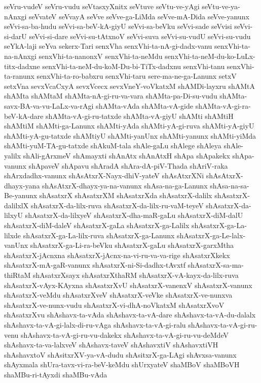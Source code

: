 {seVru-vudeV
seVru-vudu
seVtasxyXnitx
seVtuve
seVtu-ve-yAgi
seVtu-ve-ya-nAnxgi
seVvateV
seVvayA
seVve
seVve-ga-LiMda
seVve-mA-Dida
seVve-yanunx
seVvi-sa-ba-hudu
seVvi-sa-beV-kA-giyU
seVvi-sa-beVku
seVvi-sade
seVvisi
seVvi-si-darU
seVvi-si-dare
seVvi-su-tAtxnoV
seVvi-suva
seVvi-su-vudU
seVvi-su-vudu
seYkA-laji
seYva
sekerx-Tari
senxVha
senxVhi-ta-nA-gi-dadx-vanu
senxVhi-ta-na-nAnxgi
senxVhi-ta-nanonxV
senxVhi-ta-neMdu
senxVhi-ta-neM-du-ko-LuLx-titx-dadxne
senxVhi-ta-neM-du-koM-Du-bi-TiTx-dadxnu
senxVhi-tanu
senxVhi-ta-ranunx
senxVhi-ta-ro-babxru
senxVhi-taru
sere-ma-ne-ga-Lanunx
setxV
setxVna
sevxVcaCxyA
sevxVcecx
sevxVneY-voVkatxM
shAMDi-layxru
shAMtA
shAMta
shAMtaM
shAMta-nA-gi-ru-va-vara
shAMta-pa-Di-su-vudu
shAMta-savx-BA-va-vu-LaLx-va-rAgi
shAMta-vAda
shAMta-vA-gide
shAMta-vA-gi-ra-beV-kA-dare
shAMta-vA-gi-ru-tatxde
shAMta-vA-giyU
shAMti
shAMtiH
shAMtiM
shAMti-ga-Lanunx
shAMti-yAda
shAMti-yA-gi-ruva
shAMti-yA-giyU
shAMti-yA-gu-tatxde
shAMtiyU
shAMti-yanUnx
shAMti-yanunx
shAMti-yiMda
shAMti-yuM-TA-gu-tatxde
shAkuM-tala
shAle-gaLu
shAlege
shAleya
shAle-yalilx
shAli-gArxmeV
shAmayxti
shAnAtx
shAnAtxH
shApa
shApakekx
shApa-vanunx
shApaveV
shApavu
shAradA
shAra-dA-piV-Thada
shAriV-raka
shArxdadhx-vanunx
shAsAtxrX-Nayx-dhiV-yateV
shAsAtxrXNi
shAsAtxrX-dhayx-yana
shAsAtxrX-dhayx-ya-na-vanunx
shAsa-na-ga-Lanunx
shAsa-na-sa-Be-yanunx
shAsatxrX
shAsatxrXM
shAsatxrXda
shAsatxrX-dalilx
shAsatxrX-dalilxlX
shAsatxrX-da-lilx-ruva
shAsatxrX-da-lilx-ru-vaM-teyeV
shAsatxrX-da-lilxyU
shAsatxrX-da-lilxyeV
shAsatxrX-dha-maR-gaLu
shAsatxrX-diM-dalU
shAsatxrX-diM-daleV
shAsatxrX-gaLa
shAsatxrX-ga-Lalilx
shAsatxrX-ga-La-lilxde
shAsatxrX-ga-La-lilx-ruva
shAsatxrX-ga-Lanunx
shAsatxrX-ga-Le-lalx-vanUnx
shAsatxrX-ga-Li-ra-beVku
shAsatxrX-gaLu
shAsatxrX-garxMtha
shAsatxrX-jAcnxna
shAsatxrX-jAcnx-na-vi-ru-va-va-rige
shAsatxrXkekx
shAsatxrX-mA-gaR-vanunx
shAsatxrX-ni-Si-dadhx-tAvxtf
shAsatxrX-sa-ma-thiRtaM
shAsatxrXsayx
shAsatxrXthaRM
shAsatxrX-vA-kayx-da-lilx-ruva
shAsatxrX-vAyx-KAyxna
shAsatxrXvU
shAsatxrX-vanenxV
shAsatxrX-vanunx
shAsatxrX-veMdu
shAsatxrXveV
shAsatxrX-veVke
shAsatxrX-ve-nunxva
shAsatxrX-ve-nunx-vudu
shAsatxrX-vi-dhA-noVkatxM
shAsatxrXvoV
shAsatxrXvu
shAshavx-ta-vAda
shAshavx-ta-vA-dare
shAshavx-ta-vA-du-dalalx
shAshavx-ta-vA-gi-lalx-di-ru-vAga
shAshavx-ta-vA-gi-ralu
shAshavx-ta-vA-gi-ru-venu
shAshavx-ta-vA-gi-ru-vu-dakekx
shAshavx-ta-vA-gi-ru-vu-deMdeV
shAshavx-ta-va-lalxveV
shAshavx-taveV
shAshavxtiV
shAshavxtiVH
shAshavxtoV
shAsitxrXV-ya-vA-dudu
shAsitxrX-ga-LAgi
shAvxsa-vanunx
shAyxmala
shUra-tavx-vi-ra-beV-keMdu
shUrxyateV
shaMBoV
shaMBoVH
shaMBu-ri-tAyxdi
shaMBu-vAda
}
